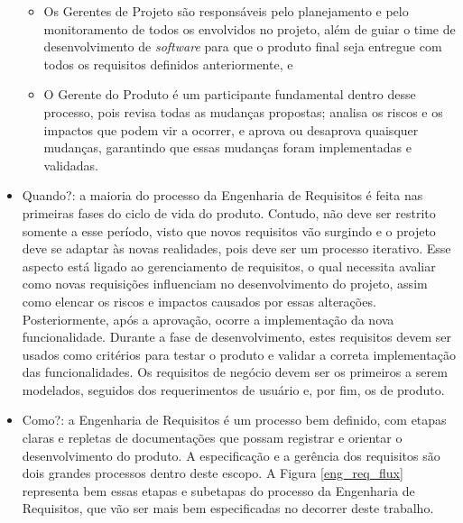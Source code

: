 \begin{itemize}
\begin{itemize}
        \item Os Gerentes de Projeto são responsáveis pelo planejamento e pelo monitoramento de todos os envolvidos no projeto, além de guiar o time de desenvolvimento de \textit{software} para que o produto final seja entregue com todos os requisitos definidos anteriormente, e
    
        \item O Gerente do Produto é um participante fundamental dentro desse processo, pois revisa todas as mudanças propostas; analisa os riscos e os impactos que podem vir a ocorrer, e aprova ou desaprova quaisquer mudanças, garantindo que essas mudanças foram implementadas e validadas.
    \end{itemize}
    
    \item Quando?: a maioria do processo da Engenharia de Requisitos é feita nas primeiras fases do ciclo de vida do produto. Contudo, não deve ser restrito somente a esse período, visto que novos requisitos vão surgindo e o projeto deve se adaptar às novas realidades, pois deve ser um processo iterativo. Esse aspecto está ligado ao gerenciamento de requisitos, o qual necessita avaliar como novas requisições influenciam no desenvolvimento do projeto, assim como elencar os riscos e impactos causados por essas alterações. Posteriormente, após a aprovação, ocorre a implementação da nova funcionalidade. Durante a fase de desenvolvimento, estes requisitos devem ser usados como critérios para testar o produto e validar a correta implementação das funcionalidades. Os requisitos de negócio devem ser os primeiros a serem modelados, seguidos dos requerimentos de usuário e, por fim, os de produto.
    
    \item Como?: a Engenharia de Requisitos é um processo bem definido, com etapas claras e repletas de documentações que possam registrar e orientar o desenvolvimento do produto. A especificação e a gerência dos requisitos são dois grandes processos dentro deste escopo. A Figura \ref{eng_req_flux} representa bem essas etapas e subetapas do processo da Engenharia de Requisitos, que vão ser mais bem especificadas no decorrer deste trabalho.
    

\end{itemize}
